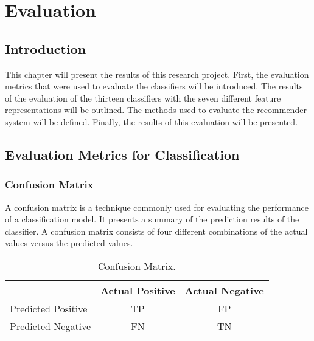 \chapter{Evaluation}

\section{Introduction}
This chapter will present the results of this research project. First, the evaluation metrics that were used to evaluate the classifiers will be introduced. The results of the evaluation of the thirteen classifiers with the seven different feature representations will be outlined. The methods used to evaluate the recommender system will be defined. Finally, the results of this evaluation will be presented. 

\section{Evaluation Metrics for Classification}

\subsection*{Confusion Matrix}
A confusion matrix is a technique commonly used for evaluating the performance of a classification model. It presents a summary of the prediction results of the classifier. A confusion matrix consists of four different combinations of the actual values versus the predicted values. 

\begin{table}[h!]
\setlength\extrarowheight{5pt}
\caption{Confusion Matrix.}
\label{Table:confusionmatrix}
\begin{tabular}{c|c|c|}
\cline{2-3}
 & \multicolumn{1}{l|}{Actual Positive} & \multicolumn{1}{l|}{Actual Negative} \\ \hline
\multicolumn{1}{|l|}{Predicted Positive} & TP & FP \\ \hline
\multicolumn{1}{|l|}{Predicted Negative} & FN & TN \\ \hline
\end{tabular}
\end{table}

